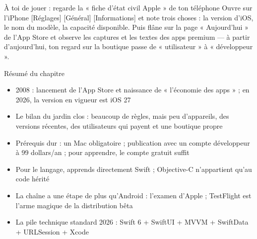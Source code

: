 \begin{tcbpractice}{À toi de jouer : regarde la « fiche d’état civil Apple » de ton téléphone}
Ouvre sur l’iPhone [Réglages] [Général] [Informations] et note trois choses : la version d’iOS, le nom du modèle, la capacité disponible. Puis flâne sur la page « Aujourd’hui » de l’App Store et observe les captures et les textes des apps premium — à partir d’aujourd’hui, ton regard sur la boutique passe de « utilisateur » à « développeur ».

\end{tcbpractice}

\begin{tcbsummary}{Résumé du chapitre}
\begin{itemize}
  \item 2008 : lancement de l’App Store et naissance de « l’économie des apps » ; en 2026, la version en vigueur est iOS 27
  \item Le bilan du jardin clos : beaucoup de règles, mais peu d’appareils, des versions récentes, des utilisateurs qui payent et une boutique propre
  \item Prérequis dur : un Mac obligatoire ; publication avec un compte développeur à 99 dollars/an ; pour apprendre, le compte gratuit suffit
  \item Pour le langage, apprends directement Swift ; Objective-C n’appartient qu’au code hérité
  \item La chaîne a une étape de plus qu’Android : l’examen d’Apple ; TestFlight est l’arme magique de la distribution bêta
  \item La pile technique standard 2026 : Swift 6 + SwiftUI + MVVM + SwiftData + URLSession + Xcode
\end{itemize}

\end{tcbsummary}
